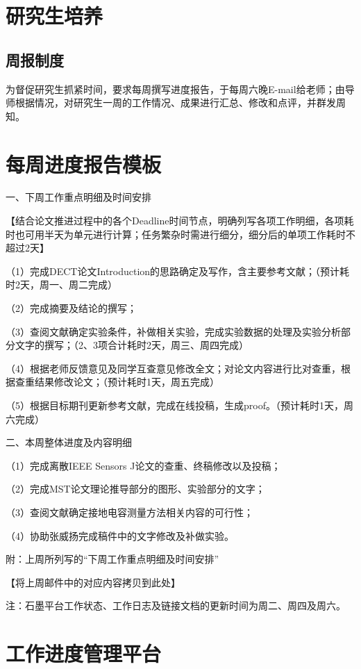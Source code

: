\section{研究生培养}

\subsection{周报制度}

为督促研究生抓紧时间，要求每周撰写进度报告，于每周六晚E-mail给老师；由导师根据情况，对研究生一周的工作情况、成果进行汇总、修改和点评，并群发周知。



\section{每周进度报告模板}


一、下周工作重点明细及时间安排

【结合论文推进过程中的各个Deadline时间节点，明确列写各项工作明细，各项耗时也可用半天为单元进行计算；任务繁杂时需进行细分，细分后的单项工作耗时不超过2天】

（1）完成DECT论文Introduction的思路确定及写作，含主要参考文献；（预计耗时2天，周一、周二完成）

（2）完成摘要及结论的撰写；

（3）查阅文献确定实验条件，补做相关实验，完成实验数据的处理及实验分析部分文字的撰写；（2、3项合计耗时2天，周三、周四完成）

（4）根据老师反馈意见及同学互查意见修改全文；对论文内容进行比对查重，根据查重结果修改论文；（预计耗时1天，周五完成）

（5）根据目标期刊更新参考文献，完成在线投稿，生成proof。（预计耗时1天，周六完成）

二、本周整体进度及内容明细

（1）完成离散IEEE Sensors J论文的查重、终稿修改以及投稿；

（2）完成MST论文理论推导部分的图形、实验部分的文字；

（3）查阅文献确定接地电容测量方法相关内容的可行性；

（4）协助张威扬完成稿件中的文字修改及补做实验。


附：上周所列写的“下周工作重点明细及时间安排”

【将上周邮件中的对应内容拷贝到此处】


注：石墨平台工作状态、工作日志及链接文档的更新时间为周二、周四及周六。

\section{工作进度管理平台}
